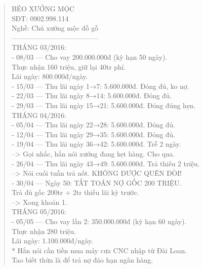 \documentclass[12pt,a4paper]{article}
\begin{document}
\begin{quote}
\fontsize{9pt}{11pt}\selectfont\ttfamily
BÉO XƯỞNG MỘC\\
SĐT: 0902.998.114\\
Nghề: Chủ xưởng mộc đồ gỗ\\
--------------------------------------\\
\vspace{0.2cm}
THÁNG 03/2016:\\
- 08/03 --- Cho vay 200.000.000đ (kỳ hạn 50 ngày).\\
          Thực nhận 160 triệu, giữ lại 40tr phí.\\
          Lãi ngày: 800.000đ/ngày.\\
\vspace{0.2cm}
- 15/03 --- Thu lãi ngày 1→7: 5.600.000đ. Đóng đủ, ko nợ.\\
- 22/03 --- Thu lãi ngày 8→14: 5.600.000đ. Đóng đủ.\\
- 29/03 --- Thu lãi ngày 15→21: 5.600.000đ. Đóng đúng hẹn.\\
\vspace{0.2cm}
THÁNG 04/2016:\\
- 05/04 --- Thu lãi ngày 22→28: 5.600.000đ. Đóng đủ.\\
- 12/04 --- Thu lãi ngày 29→35: 5.600.000đ. Đóng đủ.\\
- 19/04 --- Thu lãi ngày 36→42: 5.600.000đ. Trễ 2 ngày.\\
          --> Gọi nhắc, hắn nói xưởng đang kẹt hàng. Cho qua.\\
- 26/04 --- Thu lãi ngày 43→49: 5.600.000đ. Trả thiếu 2 triệu.\\
          --> Nói cuối tuần trả nốt. KHÔNG ĐƯỢC QUÊN ĐÒI!\\
- 30/04 --- Ngày 50: TẤT TOÁN NỢ GỐC 200 TRIỆU.\\
          Trả đủ gốc 200tr + 2tr thiếu lãi kỳ trước.\\
          --> Xong khoản 1.\\
\vspace{0.2cm}
THÁNG 05/2016:\\
- 05/05 --- Cho vay lần 2: 350.000.000đ (kỳ hạn 60 ngày).\\
          Thực nhận 280 triệu.\\
          Lãi ngày: 1.100.000đ/ngày.\\
          * Hắn nói cần tiền mua máy cưa CNC nhập từ Đài Loan.\\
            Tao biết thừa là để trả nợ đáo hạn ngân hàng.\\

\end{quote}
\end{document}
